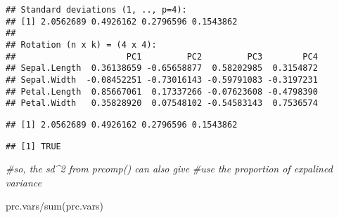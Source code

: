 \documentclass[
]{book}
\newenvironment{Shaded}{\begin{snugshade}}{\end{snugshade}}
\newcommand{\CommentTok}[1]{\textcolor[rgb]{0.56,0.35,0.01}{\textit{#1}}}
\newcommand{\DecValTok}[1]{\textcolor[rgb]{0.00,0.00,0.81}{#1}}
\newcommand{\FunctionTok}[1]{\textcolor[rgb]{0.00,0.00,0.00}{#1}}
\newcommand{\NormalTok}[1]{#1}
\newcommand{\OtherTok}[1]{\textcolor[rgb]{0.56,0.35,0.01}{#1}}
\newcommand{\SpecialCharTok}[1]{\textcolor[rgb]{0.00,0.00,0.00}{#1}}
\begin{document}
\begin{verbatim}
## Standard deviations (1, .., p=4):
## [1] 2.0562689 0.4926162 0.2796596 0.1543862
## 
## Rotation (n x k) = (4 x 4):
##                      PC1         PC2         PC3        PC4
## Sepal.Length  0.36138659 -0.65658877  0.58202985  0.3154872
## Sepal.Width  -0.08452251 -0.73016143 -0.59791083 -0.3197231
## Petal.Length  0.85667061  0.17337266 -0.07623608 -0.4798390
## Petal.Width   0.35828920  0.07548102 -0.54583143  0.7536574
\end{verbatim}

\begin{Shaded}
\end{Shaded}

\begin{verbatim}
## [1] 2.0562689 0.4926162 0.2796596 0.1543862
\end{verbatim}

\begin{Shaded}
\end{Shaded}

\begin{verbatim}
## [1] TRUE
\end{verbatim}

\begin{Shaded}
\begin{Highlighting}[]
\CommentTok{\#so, the sd\^{}2 from prcomp() can also give}
\CommentTok{\#use the proportion of expalined variance}

\NormalTok{prc.vars}\SpecialCharTok{/}\FunctionTok{sum}\NormalTok{(prc.vars)}
\end{Highlighting}
\end{Shaded}
\end{document}
